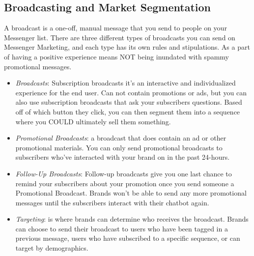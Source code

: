 \documentclass[	DIV=calc,%
							paper=letter,%
							fontsize=12pt%
                            ]{scrartcl}	 					%
\begin{document}
\subsection{\label{sec:level2}Broadcasting and Market Segmentation}

A broadcast is a one-off, manual message that you send to people on your Messenger list. There are three different types of broadcasts you can send on Messenger Marketing, and each type has its own rules and stipulations. As a part of having a positive experience means NOT being inundated with spammy promotional messages.


\begin{itemize}
\item \textit{Broadcasts}: Subscription broadcasts it’s an interactive and individualized experience for the end user. Can not contain promotions or ads, but you can also use subscription broadcasts that ask your subscribers questions. Based off of which button they click, you can then segment them into a sequence where you COULD ultimately sell them something. 

\item \textit{Promotional Broadcasts}: a broadcast that does contain an ad or other promotional materials. You can only send promotional broadcasts to subscribers who’ve interacted with your brand on in the past 24-hours.

\item \textit{Follow-Up Broadcasts}: Follow-up broadcasts give you one last chance to remind your subscribers about your promotion once you send someone a Promotional Broadcast. Brands won’t be able to send any more promotional messages until the subscribers interact with their chatbot again.

\item \textit{Targeting}: is where brands can determine who receives the broadcast. Brands can choose to send their broadcast to users who have been tagged in a previous message, users who have subscribed to a specific sequence, or can target by demographics.
\end{itemize}
\end{document}
